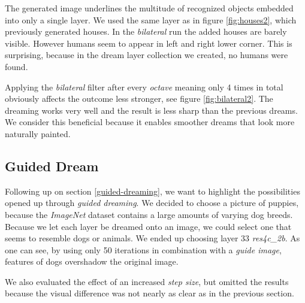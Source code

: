 The generated image underlines the multitude of recognized objects embedded into only a single layer.
We used the same layer as in figure \ref{fig:houses2}, which previously generated houses.
In the \emph{bilateral} run the added houses are barely visible.
However humans seem to appear in left and right lower corner.
This is surprising, because in the dream layer collection we created, no humans were found.

Applying the \emph{bilateral} filter after every \textit{octave} meaning only 4 times in total obviously affects the outcome less stronger, see figure \ref{fig:bilateral2}.
The dreaming works very well and the result is less sharp than the previous dreams.
We consider this beneficial because it enables smoother dreams that look more naturally painted.





\subsection{Guided Dream}
\label{sec:withguide}
Following up on section \ref{guided-dreaming}, we want to highlight the possibilities opened up through \textit{guided dreaming}.
We decided to choose a picture of puppies, because the \emph{ImageNet} dataset contains a large amounts of varying dog breeds.
Because we let each layer be dreamed onto an image, we could select one that seems to resemble dogs or animals.
We ended up choosing layer 33 \emph{res4c\_2b}.
As one can see, by using only 50 iterations in combination with a \textit{guide image}, features of dogs overshadow the original image.

We also evaluated the effect of an increased \emph{step size}, but omitted the results because the visual difference was not nearly as clear as in the previous section.

